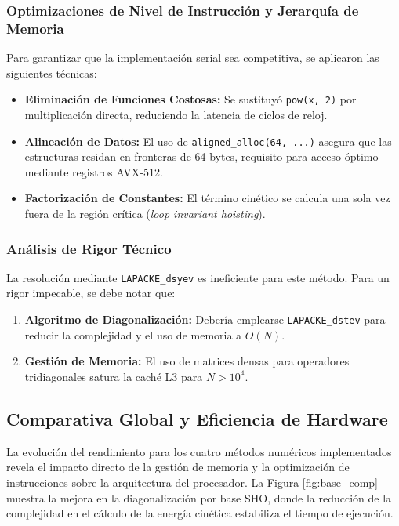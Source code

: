\documentclass[11pt,fleqn]{article}
\begin{document}
\subsubsection{Optimizaciones de Nivel de Instrucción y Jerarquía de Memoria}
Para garantizar que la implementación serial sea competitiva, se aplicaron las siguientes técnicas:
\begin{itemize}
    \item \textbf{Eliminación de Funciones Costosas:} Se sustituyó \texttt{pow(x, 2)} por multiplicación directa, reduciendo la latencia de ciclos de reloj.
    \item \textbf{Alineación de Datos:} El uso de \texttt{aligned\_alloc(64, ...)} asegura que las estructuras residan en fronteras de 64 bytes, requisito para acceso óptimo mediante registros AVX-512.
    \item \textbf{Factorización de Constantes:} El término cinético se calcula una sola vez fuera de la región crítica (\textit{loop invariant hoisting}).
\end{itemize}

\subsubsection{Análisis de Rigor Técnico}
La resolución mediante \texttt{LAPACKE\_dsyev} es ineficiente para este método. Para un rigor impecable, se debe notar que:
\begin{enumerate}
    \item \textbf{Algoritmo de Diagonalización:} Debería emplearse \texttt{LAPACKE\_dstev} para reducir la complejidad y el uso de memoria a $O(N)$.
    \item \textbf{Gestión de Memoria:} El uso de matrices densas para operadores tridiagonales satura la caché L3 para $N > 10^4$.
\end{enumerate}
\subsection{Comparativa Global y Eficiencia de Hardware}

La evolución del rendimiento para los cuatro métodos numéricos implementados revela el impacto directo de la gestión de memoria y la optimización de instrucciones sobre la arquitectura del procesador. La Figura \ref{fig:base_comp} muestra la mejora en la diagonalización por base SHO, donde la reducción de la complejidad en el cálculo de la energía cinética estabiliza el tiempo de ejecución.
\end{document}
